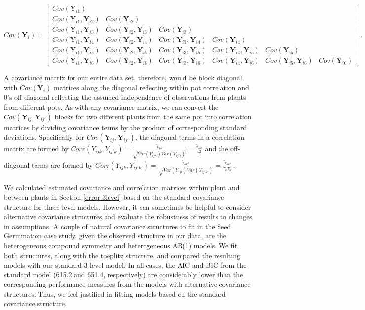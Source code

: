 \documentclass[
]{krantz}
\begin{document}
\begin{tiny}
\[  Cov(\textbf{Y}_{i}) = \left[
          \begin{array}{cccccc}
            Cov(\textbf{Y}_{i1}) & & & & & \\
            Cov(\textbf{Y}_{i1},\textbf{Y}_{i2}) & Cov(\textbf{Y}_{i2}) & & & & \\
            Cov(\textbf{Y}_{i1},\textbf{Y}_{i3}) & Cov(\textbf{Y}_{i2},\textbf{Y}_{i3}) & Cov(\textbf{Y}_{i3}) & & & \\
            Cov(\textbf{Y}_{i1},\textbf{Y}_{i4}) & Cov(\textbf{Y}_{i2},\textbf{Y}_{i4}) & Cov(\textbf{Y}_{i3},\textbf{Y}_{i4}) & Cov(\textbf{Y}_{i4}) & & \\
            Cov(\textbf{Y}_{i1},\textbf{Y}_{i5}) & Cov(\textbf{Y}_{i2},\textbf{Y}_{i5}) & Cov(\textbf{Y}_{i3},\textbf{Y}_{i5}) & Cov(\textbf{Y}_{i4},\textbf{Y}_{i5}) & Cov(\textbf{Y}_{i5}) & \\
            Cov(\textbf{Y}_{i1},\textbf{Y}_{i6}) & Cov(\textbf{Y}_{i2},\textbf{Y}_{i6}) & Cov(\textbf{Y}_{i3},\textbf{Y}_{i6}) & Cov(\textbf{Y}_{i4},\textbf{Y}_{i6}) & Cov(\textbf{Y}_{i5},\textbf{Y}_{i6}) & Cov(\textbf{Y}_{i6})
          \end{array} \right]. \]
\end{tiny}

A covariance matrix for our entire data set, therefore, would be block diagonal, with \(Cov(\textbf{Y}_{i})\) matrices along the diagonal reflecting within pot correlation and 0's off-diagonal reflecting the assumed independence of observations from plants from different pots. As with any covariance matrix, we can convert the \(Cov(\textbf{Y}_{ij},\textbf{Y}_{ij'})\) blocks for two different plants from the same pot into correlation matrices by dividing covariance terms by the product of corresponding standard deviations. Specifically, for \(Cov(\textbf{Y}_{ij},\textbf{Y}_{ij'})\), the diagonal terms in a correlation matrix are formed by \(Corr(Y_{ijk},Y_{ij'k})=\frac{\tilde{\tau}_{kk}}{\sqrt{Var(Y_{ijk})Var(Y_{ij'k})}}=\frac{\tilde{\tau}_{kk}}{\tau_{k}^{2}}\) and the off-diagonal terms are formed by \(Corr(Y_{ijk},Y_{ij'k'})=\frac{\tilde{\tau}_{kk'}}{\sqrt{Var(Y_{ijk})Var(Y_{ij'k'})}}=\frac{\tilde{\tau}_{kk'}}{\tau_{k}\tau_{k'}}\).

We calculated estimated covariance and correlation matrices within plant and between plants in Section \ref{error-3level} based on the standard covariance structure for three-level models. However, it can sometimes be helpful to consider alternative covariance structures and evaluate the robustness of results to changes in assumptions. A couple of natural covariance structures to fit in the Seed Germination case study, given the observed structure in our data, are the heterogeneous compound symmetry and heterogeneous AR(1) models. We fit both structures, along with the toeplitz structure, and compared the resulting models with our standard 3-level model. In all cases, the AIC and BIC from the standard model (615.2 and 651.4, respectively) are considerably lower than the corresponding performance measures from the models with alternative covariance structures. Thus, we feel justified in fitting models based on the standard covariance structure.
\end{document}
